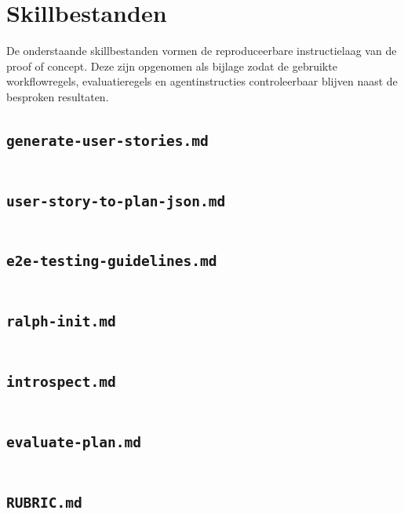 \chapter{Skillbestanden}
\label{app:skillbestanden}

De onderstaande skillbestanden vormen de reproduceerbare instructielaag van de proof of concept. Deze zijn opgenomen als bijlage zodat de gebruikte workflowregels, evaluatieregels en agentinstructies controleerbaar blijven naast de besproken resultaten.

\section{\texttt{generate-user-stories.md}}
\label{app:generate-user-stories}

\inputminted[breakanywhere,fontsize=\small,frame=single]{markdown}{skills/generate-user-stories.md}

\section{\texttt{user-story-to-plan-json.md}}
\label{app:user-story-to-plan-json}

\inputminted[breakanywhere,fontsize=\small,frame=single]{markdown}{skills/user-story-to-plan-json.md}

\section{\texttt{e2e-testing-guidelines.md}}
\label{app:e2e-testing-guidelines}

\inputminted[breakanywhere,fontsize=\small,frame=single]{markdown}{skills/e2e-testing-guidelines.md}

\section{\texttt{ralph-init.md}}
\label{app:ralph-init}

\inputminted[breakanywhere,fontsize=\small,frame=single]{markdown}{skills/ralph-init.md}

\section{\texttt{introspect.md}}
\label{app:introspect}

\inputminted[breakanywhere,fontsize=\small,frame=single]{markdown}{skills/introspect.md}

\section{\texttt{evaluate-plan.md}}
\label{app:evaluate-plan}

\inputminted[breakanywhere,fontsize=\small,frame=single]{markdown}{skills/evaluate-plan.md}

\section{\texttt{RUBRIC.md}}
\label{app:rubric}

\inputminted[breakanywhere,fontsize=\small,frame=single]{markdown}{skills/RUBRIC.md}
